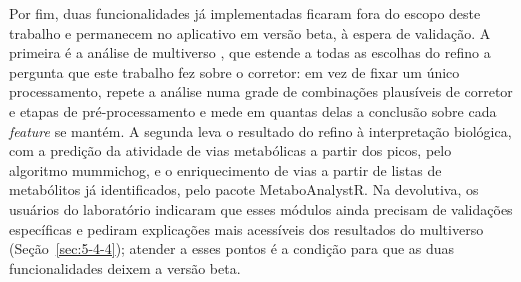 Por fim, duas funcionalidades já implementadas ficaram fora do escopo deste trabalho e permanecem no aplicativo em versão beta, à espera de validação. A primeira é a análise de multiverso \cite{steegen2016increasing}, que estende a todas as escolhas do refino a pergunta que este trabalho fez sobre o corretor: em vez de fixar um único processamento, repete a análise numa grade de combinações plausíveis de corretor e etapas de pré-processamento e mede em quantas delas a conclusão sobre cada \textit{feature} se mantém. A segunda leva o resultado do refino à interpretação biológica, com a predição da atividade de vias metabólicas a partir dos picos, pelo algoritmo mummichog, e o enriquecimento de vias a partir de listas de metabólitos já identificados, pelo pacote MetaboAnalystR. Na devolutiva, os usuários do laboratório indicaram que esses módulos ainda precisam de validações específicas e pediram explicações mais acessíveis dos resultados do multiverso (Seção~\ref{sec:5-4-4}); atender a esses pontos é a condição para que as duas funcionalidades deixem a versão beta.
